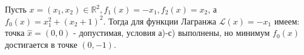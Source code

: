 \begin{task}



Пусть $x=\left(x_{1}, x_{2}\right) \in \mathbb{R}^{2}, f_{1}(x)=-x_{1}, f_{2}(x)=x_{2}$, а 
$f_{0}(x)=x_{1}^{2}+\left(x_{2}+1\right)^{2}$. 
Тогда для функции Лагранжа ${\mathcal{L}(x)=-x_1}$ имеем: точка $\hat{x}=(0,0)$ 
- допустимая, условия а)-с) выполнены, но минимум $f_{0}(x)$ достигается в точке $(0,-1)$.


\end{task}
